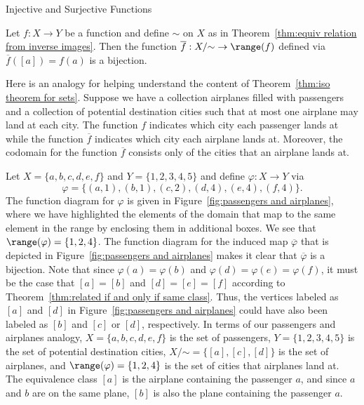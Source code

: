 \begin{section}{Injective and Surjective Functions}
\begin{theorem}\label{thm:iso theorem for sets}
Let $f:X\to Y$ be a function and define $\sim$ on $X$ as in Theorem~\ref{thm:equiv relation from inverse images}. 
Then the function $\overline{f}:X/\mathord\sim\to \range(f)$ defined via $\overline{f}([a]) = f(a)$ is a bijection.
\end{theorem}

Here is an analogy for helping understand the content of Theorem~\ref{thm:iso theorem for sets}.  Suppose we have a collection airplanes filled with passengers and a collection of potential destination cities such that at most one airplane may land at each city.  The function $f$ indicates which city each passenger lands at while the function $\overline{f}$ indicates which city each airplane lands at.  Moreover, the codomain for the function $\overline{f}$ consists only of the cities that an airplane lands at.

\begin{example}
Let $X=\{a,b,c,d,e,f\}$ and $Y=\{1,2,3,4,5\}$ and define $\varphi:X\to Y$ via
\[
\varphi=\{(a,1),(b,1),(c,2),(d,4),(e,4),(f,4)\}.
\]
The function diagram for $\varphi$ is given in Figure~\ref{fig:passengers and airplanes}, where we have highlighted the elements of the domain that map to the same element in the range by enclosing them in additional boxes.  We see that $\range(\varphi)=\{1,2,4\}$. The function diagram for the induced map $\overline{\varphi}$ that is depicted in Figure~\ref{fig:passengers and airplanes} makes it clear that $\overline{\varphi}$ is a bijection.  Note that since $\varphi(a)=\varphi(b)$ and $\varphi(d)=\varphi(e)=\varphi(f)$, it must be the case that $[a]=[b]$ and $[d]=[e]=[f]$ according to Theorem~\ref{thm:related if and only if same class}.  Thus, the vertices labeled as $[a]$ and $[d]$ in Figure~\ref{fig:passengers and airplanes} could have also been labeled as $[b]$ and $[c]$ or $[d]$, respectively.  In terms of our passengers and airplanes analogy, $X=\{a,b,c,d,e,f\}$ is the set of passengers, $Y=\{1,2,3,4,5\}$ is the set of potential destination cities, $X/\mathord\sim=\{[a],[c],[d]\}$ is the set of airplanes, and $\range(\varphi)=\{1,2,4\}$ is the set of cities that airplanes land at.  The equivalence class $[a]$ is the airplane containing the passenger $a$, and since $a$ and $b$ are on the same plane, $[b]$ is also the plane containing the passenger $a$.
\end{example}


\end{section}
